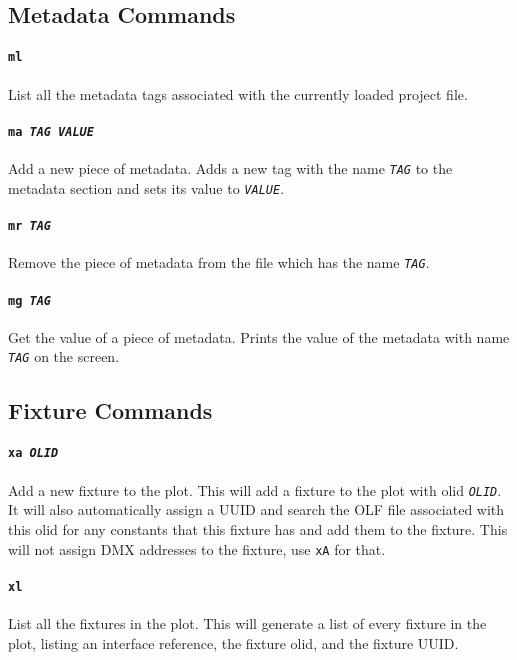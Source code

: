 \documentclass[a4paper]{article}
\begin{document}
\subsection{Metadata Commands}

\paragraph{\texttt{ml}}
List all the metadata tags associated with the currently loaded project
file.

\paragraph{\texttt{ma \textit{TAG VALUE}}}
Add a new piece of metadata. Adds a new tag with the name \texttt{\textit{TAG}}
to the metadata section and sets its value to \texttt{\textit{VALUE}}.

\paragraph{\texttt{mr \textit{TAG}}}
Remove the piece of metadata from the file which has the name 
\texttt{\textit{TAG}}.

\paragraph{\texttt{mg \textit{TAG}}}
Get the value of a piece of metadata. Prints the value of the metadata with
name \texttt{\textit{TAG}} on the screen.

\subsection{Fixture Commands}

\paragraph{\texttt{xa \textit{OLID}}}
Add a new fixture to the plot. This will add a fixture to the plot with olid 
\texttt{\textit{OLID}}. It will also automatically assign a UUID and search the 
OLF file associated with this olid for any constants that this fixture has and 
add them to the fixture. This will not assign DMX addresses to the fixture,
use \texttt{xA} for that.

\paragraph{\texttt{xl}}
List all the fixtures in the plot. This will generate a list of every fixture 
in the plot, listing an interface reference, the fixture olid, and the fixture 
UUID.
\end{document}

